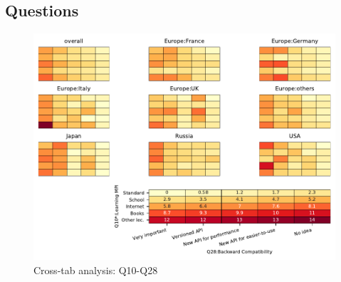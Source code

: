 
\subsection{Questions}


\begin{figure}
\begin{center}
\includegraphics[width=12cm]{../pdfs/Q10-Q28.pdf}
\caption{Cross-tab analysis: Q10-Q28}
\label{fig:Q10-Q28}
\end{center}
\end{figure}
